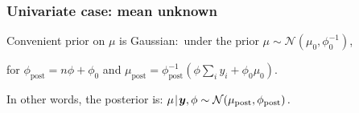 \documentclass[18pt]{beamer}
\newcommand{\defineTightItemizeSpacing}{%
	\setlength{\abovedisplayskip}{.25\baselineskip}%
	\setlength{\belowdisplayskip}{.25\baselineskip}%
}
\newenvironment{tightEquation*}{%
	\defineTightItemizeSpacing%
	\begin{equation*}
}{
	\end{equation*} \ignorespacesafterend
}
\newcommand{\given}{\thinnerspace | \thinnerspace}
\newcommand{\thinnerspace}{\mskip.5\thinmuskip}
\newcommand{\normalDist}{\mathcal{N}}
\newcommand{\density}{\pi}
\newcommand{\likelihood}{L}
\begin{document}
\newcommand{\priorPrec}{\phi_0}
\newcommand{\postPrec}{\phi_{\textrm{post}}}
\renewcommand{\frametitleText}{Univariate case: mean unknown}
\begin{frame}
\frametitle{\frametitleText}
Convenient prior on $\mu$ is Gaussian:\ under the prior $\mu \sim \normalDist(\mu_0, \priorPrec^{-1})$,%
\begin{tightEquation*}
\end{tightEquation*}
for $\postPrec = n \phi + \priorPrec$ and $\mu_{\textrm{post}} = \postPrec^{-1} \left( \phi {\textstyle \sum_i} y_i + \priorPrec \mu_0 \right)$.

\pause
\vspace*{.3\baselineskip}
In other words, the posterior is:
$
\mu \given \bm{y}, \phi
	\sim \normalDist\!\left( \mu_{\textrm{post}}, \postPrec \right).
$
\end{frame}
\end{document}

